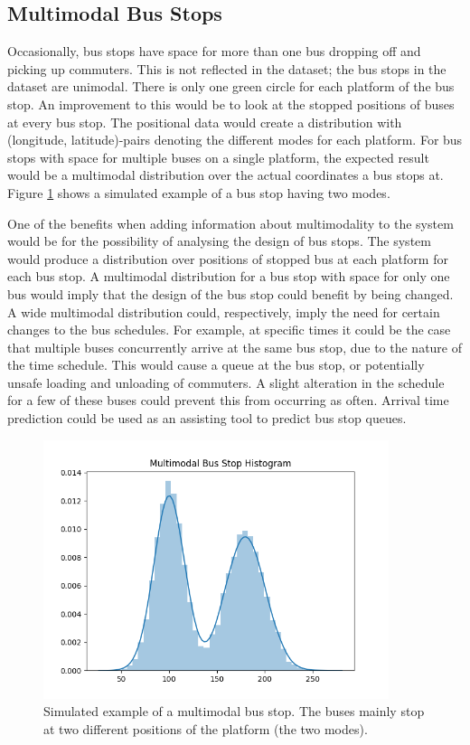 \subsection{Multimodal Bus Stops}
Occasionally, bus stops have space for more than one bus dropping off and picking up commuters.
This is not reflected in the dataset; the bus stops in the dataset are unimodal.
There is only one green circle for each platform of the bus stop.
An improvement to this would be to look at the stopped positions of buses at every bus stop.
The positional data would create a distribution with (longitude, latitude)-pairs denoting the different modes for each platform.
For bus stops with space for multiple buses on a single platform, the expected result would be a multimodal distribution over the actual coordinates a bus stops at.
Figure \ref{fig:multimodal-stops} shows a simulated example of a bus stop having two modes.

One of the benefits when adding information about multimodality to the system would be for the possibility of analysing the design of bus stops.
The system would produce a distribution over positions of stopped bus at each platform for each bus stop.
A multimodal distribution for a bus stop with space for only one bus would imply that the design of the bus stop could benefit by being changed.
A wide multimodal distribution could, respectively, imply the need for certain changes to the bus schedules.
For example, at specific times it could be the case that multiple buses concurrently arrive at the same bus stop, due to the nature of the time schedule.
This would cause a queue at the bus stop, or potentially unsafe loading and unloading of commuters.
A slight alteration in the schedule for a few of these buses could prevent this from occurring as often.
Arrival time prediction could be used as an assisting tool to predict bus stop queues.

\begin{figure}[t!]
    \centering
    \includegraphics[width=0.9\textwidth]{figures/multimodal_bus_stops}
    \caption[Simulated example of a multimodal bus stop]%
    {{\small Simulated example of a multimodal bus stop.
    The buses mainly stop at two different positions of the platform (the two modes).
    }}
    \label{fig:multimodal-stops}
\end{figure}